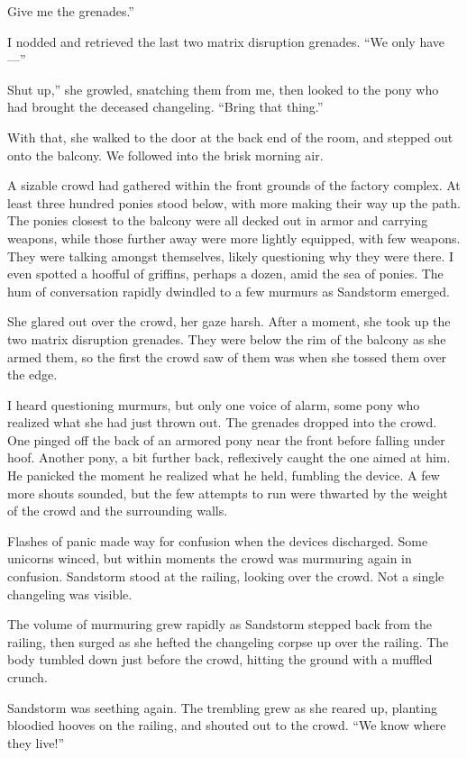 \leavevmode{}Give me the grenades.”

I nodded and retrieved the last two matrix disruption grenades. “We only have—”

\leavevmode{}Shut up,” she growled, snatching them from me, then looked to the pony who had brought the deceased changeling. “Bring that thing.”

With that, she walked to the door at the back end of the room, and stepped out onto the balcony. We followed into the brisk morning air.

A sizable crowd had gathered within the front grounds of the factory complex. At least three hundred ponies stood below, with more making their way up the path. The ponies closest to the balcony were all decked out in armor and carrying weapons, while those further away were more lightly equipped, with few weapons. They were talking amongst themselves, likely questioning why they were there. I even spotted a hoofful of griffins, perhaps a dozen, amid the sea of ponies. The hum of conversation rapidly dwindled to a few murmurs as Sandstorm emerged.

She glared out over the crowd, her gaze harsh. After a moment, she took up the two matrix disruption grenades. They were below the rim of the balcony as she armed them, so the first the crowd saw of them was when she tossed them over the edge.

I heard questioning murmurs, but only one voice of alarm, some pony who realized what she had just thrown out. The grenades dropped into the crowd. One pinged off the back of an armored pony near the front before falling under hoof. Another pony, a bit further back, reflexively caught the one aimed at him. He panicked the moment he realized what he held, fumbling the device. A few more shouts sounded, but the few attempts to run were thwarted by the weight of the crowd and the surrounding walls.

Flashes of panic made way for confusion when the devices discharged. Some unicorns winced, but within moments the crowd was murmuring again in confusion. Sandstorm stood at the railing, looking over the crowd. Not a single changeling was visible.

The volume of murmuring grew rapidly as Sandstorm stepped back from the railing, then surged as she hefted the changeling corpse up over the railing. The body tumbled down just before the crowd, hitting the ground with a muffled crunch.

Sandstorm was seething again. The trembling grew as she reared up, planting bloodied hooves on the railing, and shouted out to the crowd. “We know where they live!”

